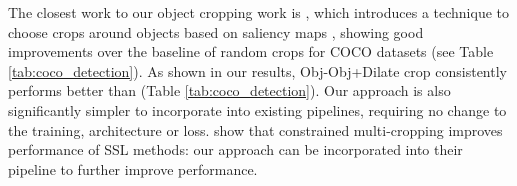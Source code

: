 The closest work to our object cropping work is \citep{selvaraju2020casting}, which introduces a technique to choose crops around objects based on saliency maps \citep{Selvaraju2016GradCAMVE}, showing good improvements over the baseline of random crops for COCO datasets (see Table \ref{tab:coco_detection}). As shown in our results, Obj-Obj+Dilate crop consistently performs better than \citep{selvaraju2020casting} (Table \ref{tab:coco_detection}). Our approach is also significantly simpler to incorporate into existing pipelines, requiring no change to the training, architecture or loss. \citet{vangansbeke2021revisiting} show that constrained multi-cropping improves performance of SSL methods: our approach can be incorporated into their pipeline to further improve performance. 





